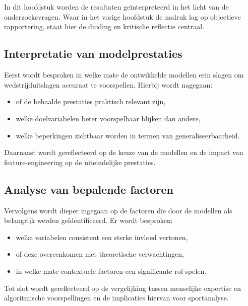\chapter{}%
\label{ch:vergelijkende-studie}

In dit hoofdstuk worden de resultaten geïnterpreteerd in het licht van de onderzoeksvragen. 
Waar in het vorige hoofdstuk de nadruk lag op objectieve rapportering, staat hier de duiding en kritische reflectie centraal.

\section{Interpretatie van modelprestaties}

Eerst wordt besproken in welke mate de ontwikkelde modellen erin slagen om wedstrijduitslagen accuraat te voorspellen. Hierbij wordt nagegaan:
\begin{itemize}
    \item of de behaalde prestaties praktisch relevant zijn,
    \item welke doelvariabelen beter voorspelbaar blijken dan andere,
    \item welke beperkingen zichtbaar worden in termen van generaliseerbaarheid.
\end{itemize}

Daarnaast wordt gereflecteerd op de keuze van de modellen en de impact van feature-engineering op de uiteindelijke prestaties.

\section{Analyse van bepalende factoren}

Vervolgens wordt dieper ingegaan op de factoren die door de modellen als belangrijk werden geïdentificeerd. Er wordt besproken:
\begin{itemize}
    \item welke variabelen consistent een sterke invloed vertonen,
    \item of deze overeenkomen met theoretische verwachtingen,
    \item in welke mate contextuele factoren een significante rol spelen.
\end{itemize}

Tot slot wordt gereflecteerd op de vergelijking tussen menselijke expertise en algoritmische voorspellingen en de implicaties hiervan voor sportanalyse.